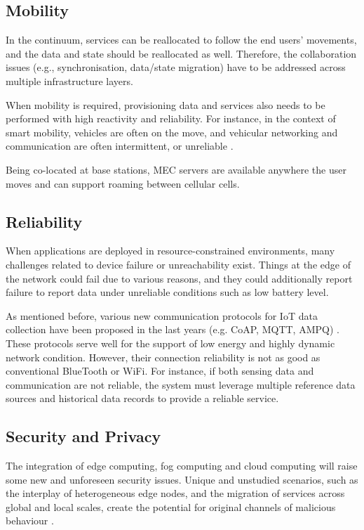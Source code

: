\subsection{Mobility}

In the continuum, services can be reallocated to follow the end users' movements, and the data and state should be reallocated as well. Therefore, the collaboration issues (e.g., synchronisation, data/state migration) have to be addressed across multiple infrastructure layers.

When mobility is required, provisioning data and services also needs to be performed with high reactivity and reliability. For instance, in the context of smart mobility, vehicles are often on the move, and vehicular networking and communication are often intermittent, or unreliable \cite{he2014developing}.

Being co-located at base stations, MEC servers are available anywhere the user moves and can support roaming between cellular cells.

\subsection{Reliability}

When applications are deployed in resource-constrained environments, many challenges related to device failure or unreachability exist. Things at the edge of the network could fail due to various reasons, and they could additionally report failure to report data under unreliable conditions such as low battery level.

As mentioned before, various new communication protocols for IoT data collection have been proposed in the last years (e.g. CoAP, MQTT, AMPQ) \cite{naik2017choice}. These protocols serve well for the support of low energy and highly dynamic network condition. However, their connection reliability is not as good as conventional BlueTooth or WiFi. For instance, if both sensing data and communication are not reliable, the system must leverage multiple reference data sources and historical data records to provide a reliable service.

\subsection{Security and Privacy}

The integration of edge computing, fog computing and cloud computing will raise some new and unforeseen security issues. Unique and unstudied scenarios, such as the interplay of heterogeneous edge nodes, and the migration of services across global and local scales, create the potential for original channels of malicious behaviour \cite{yu2017survey}.

